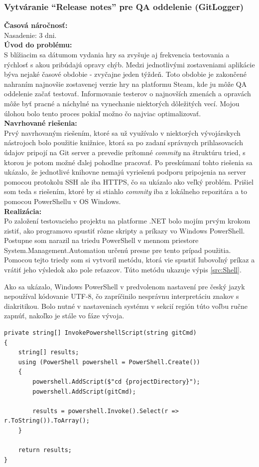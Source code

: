 \documentclass[slovak,bachelorpractice,dept460,male,csharp,cpdeclaration]{diploma}
\begin{document}
\subsubsection{Vytváranie \enquote{Release notes} pre QA oddelenie (GitLogger)}
\label{sec:GitLogger}
\textbf{Časová náročnosť:} \\ Nasadenie: 3 dni.\\
\textbf{Úvod do problému:} \\ S blížiacim sa dátumom vydania hry sa zvyšuje aj frekvencia testovania a rýchlosť s akou pribúdajú opravy chýb. Medzi jednotlivými zostaveniami aplikácie býva nejaké časové obdobie - zvyčajne jeden týždeň. Toto obdobie je zakončené nahraním najnovšie zostavenej verzie hry na platformu Steam, kde ju môže QA oddelenie začať testovať. Informovanie testerov o najnovších zmenách a opravách môže byť pracné a náchylné na vynechanie niektorých dôležitých vecí. Mojou úlohou bolo tento proces pokiaľ možno čo najviac optimalizovať.\\
\textbf{Navrhované riešenia:} \\ Prvý navrhovaným riešením, ktoré sa už využívalo v niektorých vývojárskych nástrojoch bolo použitie knižnice, ktorá sa po zadaní správnych prihlasovacích údajov pripojí na Git server a prevedie prítomné \textit{commity} na štruktúru tried, s ktorou je potom možné ďalej pohodlne pracovať. Po preskúmaní tohto riešenia sa ukázalo, že jednotlivé knihovne nemajú vyriešenú podporu pripojenia na server pomocou protokolu SSH ale iba HTTPS, čo sa ukázalo ako veľký problém. Prišiel som teda s riešením, ktoré by si stiahlo \textit{commity} iba z lokálneho repozitára a to pomocou PowerShellu v OS Windows.  \\
\textbf{Realizácia:} \\ Po založení testovacieho projektu na platforme .NET bolo mojím prvým krokom zistiť, ako programovo spustiť rôzne skripty a príkazy vo Windows PowerShell. Postupne som narazil na triedu PowerShell v mennom priestore System.Management.Automation určenú presne pre tento prípad použitia. Pomocou tejto triedy som si vytvoril metódu, ktorá vie spustiť ľubovoľný príkaz a vrátiť jeho výsledok ako pole reťazcov. Túto metódu ukazuje výpis \ref{src:Shell}. 

Ako sa ukázalo, Windows PowerShell v predvolenom nastavení pre český jazyk nepoužíval kódovanie UTF-8, čo zapríčinilo nesprávnu interpretáciu znakov s diakritikou. Bolo nutné v nastaveniach systému v sekcií región túto voľbu ručne zapnúť, nakoľko je stále vo fáze vývoja.
\vspace{10pt}
\begin{lstlisting}[label=src:Shell,caption={Metóda InvokePowershellScript triedy GitLogger}]
private string[] InvokePowershellScript(string gitCmd)
{
    string[] results;
    using (PowerShell powershell = PowerShell.Create())
    {
        powershell.AddScript($"cd {projectDirectory}");
        powershell.AddScript(gitCmd);

        results = powershell.Invoke().Select(r => r.ToString()).ToArray();
    }

    return results;
}
\end{lstlisting}
\end{document}
